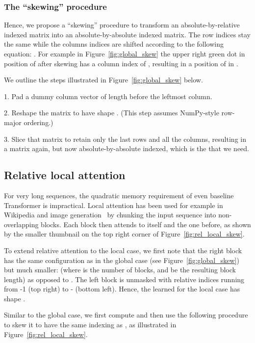 \documentclass{article} \usepackage{iclr2019_conference,times}
\begin{document}
\subsubsection{The ``skewing'' procedure}
Hence, we propose a ``skewing'' procedure to transform an absolute-by-relative  indexed matrix into an absolute-by-absolute  indexed matrix.  
The row indices  stay the same while the columns indices are shifted according to the following equation: . For example in Figure~\ref{fig:global_skew} the upper right green dot in position  of  after skewing has a column index of , resulting in a position of  in .

We outline the steps illustrated in Figure~\ref{fig:global_skew} below.
 




1. Pad a dummy column vector of length  before the leftmost column. 

2. Reshape the matrix to have shape . (This step assumes NumPy-style row-major ordering.)


3. Slice that matrix to retain only the last  rows and all the columns, resulting in a  matrix again, but now absolute-by-absolute indexed, which is the  that we need. 



\subsection{Relative local attention}
For very long sequences, the quadratic memory requirement of even baseline Transformer is impractical.  Local attention has been used for example in Wikipedia and image generation~\citep{liu2018generatin,parmar2018image} by chunking the input sequence into non-overlapping blocks.  Each block then attends to itself and the one before, as shown by the smaller thumbnail on the top right corner of Figure~\ref{fig:rel_local_skew}.  

To extend relative attention to the local case, we first note that the right block has the same configuration as in the global case (see Figure~\ref{fig:global_skew}) but much smaller: 
(where  is the number of blocks, and  be the resulting block length) as opposed to .  The left block is unmasked with relative indices running from -1 (top right) to - (bottom left).  Hence, the learned  for the local case has shape .

Similar to the global case, we first compute  and then use the following procedure to skew it to have the same indexing as , as illustrated in Figure~\ref{fig:rel_local_skew}. 
\end{document}
